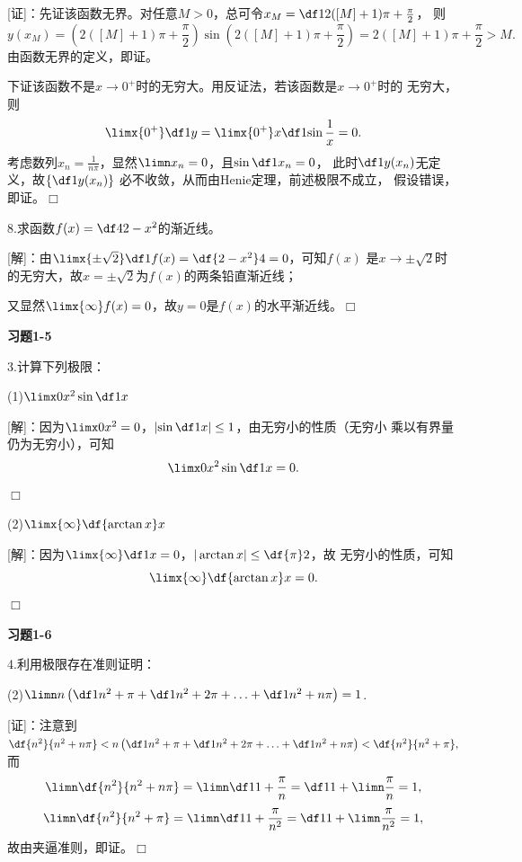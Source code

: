 [证]：先证该函数无界。对任意$M>0$，总可令$x_M=\df1{2([M]+1)\pi+\frac{\pi}2}$，
则
$$y(x_M)=\left(2([M]+1)\pi+\frac{\pi}2\right)\sin(2([M]+1)\pi+\frac{\pi}2)
=2([M]+1)\pi+\frac{\pi}2>M.$$
由函数无界的定义，即证。

下证该函数不是$x\to0^+$时的无穷大。用反证法，若该函数是$x\to0^+$时的
无穷大，则
$$\limx{0^+}\df1y=\limx{0^+}x\df1{\sin\frac1x}=0.$$
考虑数列$x_n=\frac1{n\pi}$，显然$\limn x_n=0$，且$\sin\df1{x_n}=0$，
此时$\df1{y(x_n)}$无定义，故$\left\{\df1{y(x_n)}\right\}$
必不收敛，从而由Henie定理，前述极限不成立，
假设错误，即证。\hfill$\Box$

\bigskip

8.求函数$f(x)=\df4{2-x^2}$的渐近线。

[解]：由$\limx{\pm\sqrt 2}\df1{f(x)}=\df{2-x^2}4=0$，可知$f(x)$
是$x\to\pm\sqrt2$时的无穷大，故$x=\pm\sqrt2$为$f(x)$的两条铅直渐近线；

又显然$\limx{\infty}f(x)=0$，故$y=0$是$f(x)$的水平渐近线。\hfill$\Box$

\bigskip

\begin{center}
	\bf 习题1-5
\end{center}

3.计算下列极限：

(1)$\limx0x^2\sin\df1x$

[解]：因为$\limx0x^2=0$，$\left|\sin\df1x\right|\leq1$，由无穷小的性质（无穷小
乘以有界量仍为无穷小），可知
$$\limx0x^2\sin\df1x=0.$$
\hfill$\Box$

\bigskip

(2)$\limx{\infty}\df{\arctan x}x$

[解]：因为$\limx{\infty}\df1x=0$，$|\arctan x|\leq\df{\pi}2$，故
无穷小的性质，可知
$$\limx{\infty}\df{\arctan x}x=0.$$
\hfill$\Box$

\begin{center}
	\bf 习题1-6
\end{center}

4.利用极限存在准则证明：

(2)$\limn n\left(\df1{n^2+\pi}+\df1{n^2+2\pi}+\ldots
+\df1{n^2+n\pi}\right)=1$.

[证]：注意到
$\df{n^2}{n^2+n\pi}<
n\left(\df1{n^2+\pi}+\df1{n^2+2\pi}+\ldots
+\df1{n^2+n\pi}\right)
<\df{n^2}{n^2+\pi},$
而
$$\limn\df{n^2}{n^2+n\pi}=\limn\df1{1+\frac{\pi}n}
=\df1{1+\limn\frac{\pi}n}=1,$$
$$\limn\df{n^2}{n^2+\pi}=\limn\df1{1+\frac{\pi}{n^2}}
=\df1{1+\limn\frac{\pi}{n^2}}=1,$$
故由夹逼准则，即证。\hfill$\Box$

\bigskip

